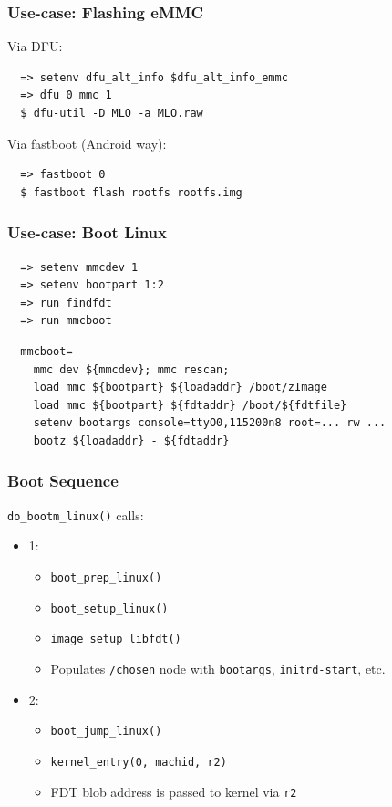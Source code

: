\begin{frame}[fragile]
  \frametitle{Use-case: Flashing eMMC}
  Via DFU:
  \begin{verbatim}
  => setenv dfu_alt_info $dfu_alt_info_emmc
  => dfu 0 mmc 1
  $ dfu-util -D MLO -a MLO.raw
  \end{verbatim}
  \pause
  Via fastboot (Android way):
  \begin{verbatim}
  => fastboot 0
  $ fastboot flash rootfs rootfs.img
  \end{verbatim}
\end{frame}

\begin{frame}[fragile]
  \frametitle{Use-case: Boot Linux}
  \begin{verbatim}
  => setenv mmcdev 1
  => setenv bootpart 1:2
  => run findfdt
  => run mmcboot
  \end{verbatim}
  \vspace*{-5mm} %
  \pause
  \begin{verbatim}
  mmcboot=
    mmc dev ${mmcdev}; mmc rescan;
    load mmc ${bootpart} ${loadaddr} /boot/zImage
    load mmc ${bootpart} ${fdtaddr} /boot/${fdtfile}
    setenv bootargs console=ttyO0,115200n8 root=... rw ...
    bootz ${loadaddr} - ${fdtaddr}
  \end{verbatim}
  \vspace*{-5mm} %
\end{frame}

\begin{frame}
  \frametitle{Boot Sequence}
  \texttt{do\_bootm\_linux()} calls:
  \begin{itemize}
    \item 1:
    \begin{itemize}
    \item \texttt{boot\_prep\_linux()}
    \item \texttt{boot\_setup\_linux()}
    \item \texttt{image\_setup\_libfdt()}
    \item Populates \texttt{/chosen} node with \texttt{bootargs},
          \texttt{initrd-start}, etc.
    \end{itemize}
    \item 2:
    \begin{itemize}
    \item \texttt{boot\_jump\_linux()}
    \item \texttt{kernel\_entry(0, machid, r2)}
    \item FDT blob address is passed to kernel via \texttt{r2}
    \end{itemize}
  \end{itemize}
\end{frame}

